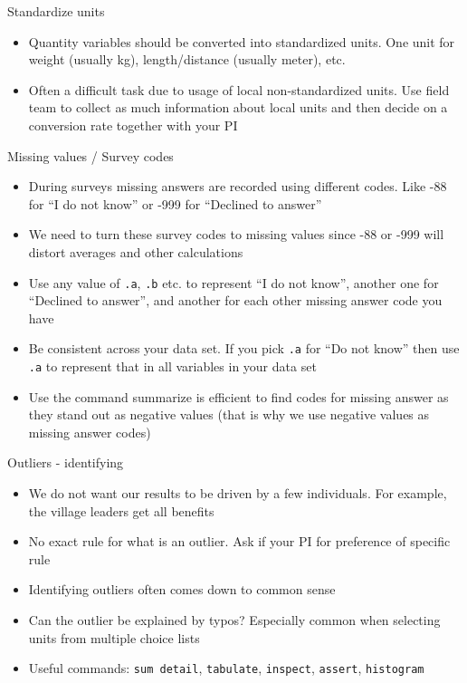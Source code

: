 \documentclass[aspectratio=169]{beamer}
\begin{document}
\begin{frame}{Standardize units }
	\begin{itemize}
		\item Quantity variables should be converted into standardized units. One unit for weight (usually kg), length/distance (usually meter), etc.
		\item Often a difficult task due to usage of local non-standardized units. Use field team to collect as much information about local units and then decide on a conversion rate together with your PI
	\end{itemize}
\end{frame}


\begin{frame}{Missing values / Survey codes}
	\begin{itemize}
		\item During surveys missing answers are recorded using different codes. Like -88 for “I do not know” or -999 for “Declined to answer”
		\item We need to turn these survey codes to missing values since -88 or -999 will distort averages and other calculations
		\item Use any value of \texttt{.a}, \texttt{.b} etc. to represent “I do not know”, another one for “Declined to answer”, and another for each other missing answer code you have
		\item Be consistent across your data set. If you pick \texttt{.a} for “Do not know” then use \texttt{.a} to represent that in all variables in your data set
		\item Use the command summarize is efficient to find codes for missing answer as they stand out as negative values (that is why we use negative values as missing answer codes)
	\end{itemize}
\end{frame}



\begin{frame}{Outliers - identifying}
\begin{itemize}
	\item We do not want our results to be driven by a few individuals. For example, the village leaders get all benefits
	\item No exact rule for what is an outlier.  Ask if your PI for preference of specific rule
	\item Identifying outliers often comes down to common sense
	\item Can the outlier be explained by typos? Especially common when selecting units from multiple choice lists
	\item Useful commands: \texttt{sum detail}, \texttt{tabulate}, \texttt{inspect}, \texttt{assert}, \texttt{histogram}

\end{itemize}
\end{frame}
\end{document}
